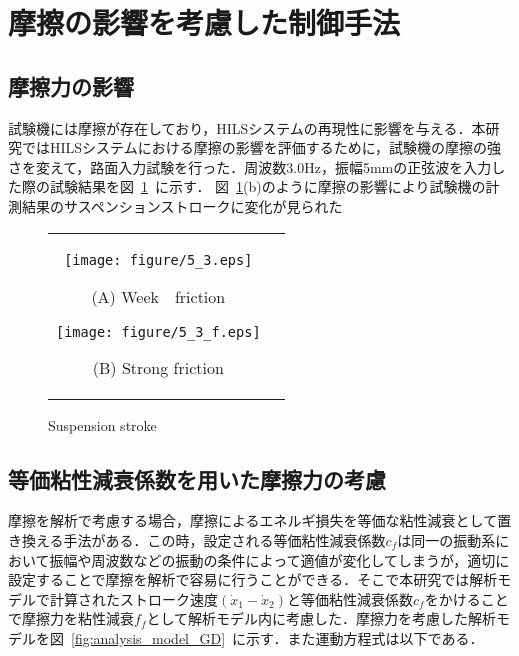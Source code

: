 \documentclass{article_vdlab_sotsuron_youshi}
\begin{document}
\newpage
 \section{摩擦の影響を考慮した制御手法}
 \subsection{摩擦力の影響}
 試験機には摩擦が存在しており，HILSシステムの再現性に影響を与える．本研究ではHILSシステムにおける摩擦の影響を評価するために，試験機の摩擦の強さを変えて，路面入力試験を行った．周波数3.0Hz，振幅5mmの正弦波を入力した際の試験結果を図~\ref{fig:friction}~に示す．
 図~\ref{fig:friction}(b)のように摩擦の影響により試験機の計測結果のサスペンションストロークに変化が見られた
 \vspace{-1mm}
 \begin{figure}[h]
     \begin{tabular}{cc}
       \begin{minipage}{0.5\hsize}
 	\centering
 	  \texttt{[image: figure/5\_3.eps]}
 	  \begin{center}
 	  \vspace{-4mm}
 	  \ (A) Week　friction\
 	  \end{center}
 	\end{minipage}
        \begin{minipage}{0.5\hsize}
 	\centering
 	  \texttt{[image: figure/5\_3\_f.eps]}
 	  \begin{center}
 	  \vspace{-4mm}
 	  \ (B) Strong friction\
 	  \end{center}
       \end{minipage}
     \end{tabular}
     \vspace{-1mm}
     \caption{Suspension stroke}
     \label{fig:friction}
 \end{figure}
 \subsection{等価粘性減衰係数を用いた摩擦力の考慮}
 \par
 摩擦を解析で考慮する場合，摩擦によるエネルギ損失を等価な粘性減衰として置き換える手法がある．この時，設定される等価粘性減衰係数$c_f$は同一の振動系において振幅や周波数などの振動の条件によって適値が変化してしまうが，適切に設定することで摩擦を解析で容易に行うことができる．そこで本研究では解析モデルで計算されたストローク速度$(\dot{x}_1-\dot{x}_2)$と等価粘性減衰係数$c_f$をかけることで摩擦力を粘性減衰$f_f$として解析モデル内に考慮した．摩擦力を考慮した解析モデルを図~\ref{fig:analysis_model_GD}~に示す．また運動方程式は以下である．
\end{document}
